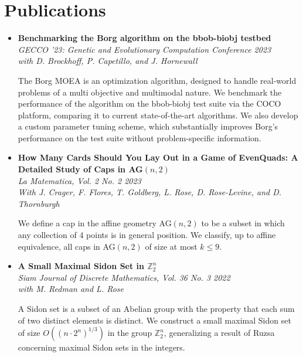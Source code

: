 \documentclass[12pt,letterpaper]{article}
\begin{document}
\section*{Publications}
\begin{itemize}[label=]
    \item
        \textbf{Benchmarking the Borg algorithm on the bbob-biobj testbed}\\
        \textit{GECCO '23: Genetic and Evolutionary Computation Conference \hfill 2023}\\
        \textit{with D. Brockhoff, P. Capetillo, and J. Hornewall}

        The Borg MOEA is an optimization algorithm, designed to handle real-world problems of a multi objective and multimodal nature.
        We benchmark the performance of the algorithm on the bbob-biobj test suite via the COCO platform, comparing it to current state-of-the-art algorithms.
        We also develop a custom parameter tuning scheme, which substantially improves Borg's performance on the test suite without problem-specific information.

    \item
        \textbf{How Many Cards Should You Lay Out in a Game of EvenQuads: A Detailed Study of Caps in AG$(n, 2)$}\\
        \textit{La Matematica, Vol. 2 No. 2 \hfill 2023}\\
        \textit{With J. Crager, F. Flores, T. Goldberg, L. Rose, D. Rose-Levine, and D. Thornburgh}

        We define a cap in the affine geometry AG$(n, 2)$ to be a subset in which any collection of 4 points is in general position.
        We classify, up to affine equivalence, all caps in AG$(n, 2)$ of size at most $k \leq 9$.

    \item
        \textbf{A Small Maximal Sidon Set in $\mathbb{Z}_2^n$}\\
        \textit{Siam Journal of Discrete Mathematics, Vol. 36 No. 3 \hfill 2022}\\
        \textit{with M. Redman and L. Rose}

        A Sidon set is a subset of an Abelian group with the property that each sum of two distinct elements is distinct.
        We construct a small maximal Sidon set of size $O((n \cdot 2^n)^{1/3})$ in the group ${\mathbb{Z}}_2^n$,
        generalizing a result of Ruzsa concerning maximal Sidon sets in the integers.

\end{itemize}
\end{document}
